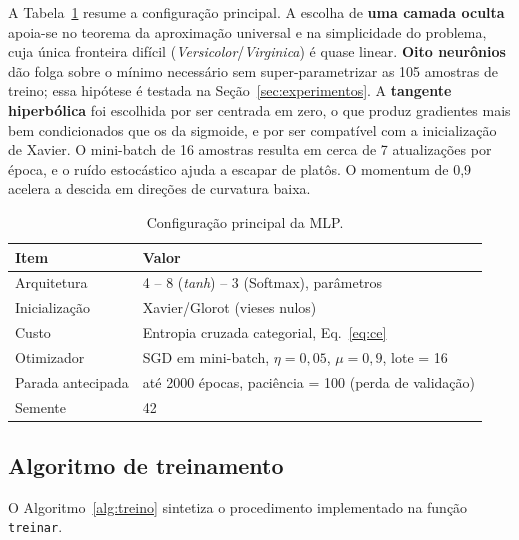 \documentclass[12pt,a4paper]{article}
\begin{document}
A Tabela~\ref{tab:config} resume a configuração principal. A escolha de \textbf{uma camada oculta}
apoia-se no teorema da aproximação universal e na simplicidade do problema, cuja única fronteira
difícil (\textit{Versicolor}/\textit{Virginica}) é quase linear. \textbf{Oito neurônios} dão folga
sobre o mínimo necessário sem super-parametrizar as 105 amostras de treino; essa hipótese é testada
na Seção~\ref{sec:experimentos}. A \textbf{tangente hiperbólica} foi escolhida por ser centrada em
zero, o que produz gradientes mais bem condicionados que os da sigmoide, e por ser compatível com a
inicialização de Xavier. O mini-batch de 16 amostras resulta em cerca de 7 atualizações por época, e
o ruído estocástico ajuda a escapar de platôs. O momentum de 0,9 acelera a descida em direções de
curvatura baixa.

\begin{table}[H]
  \centering
  \caption{Configuração principal da MLP.}
  \label{tab:config}
  \small
  \begin{tabular}{ll}
    \toprule
    Item & Valor \\
    \midrule
    Arquitetura & 4 -- 8 (\textit{tanh}) -- 3 (Softmax), \NParam{} parâmetros \\
    Inicialização & Xavier/Glorot (vieses nulos) \\
    Custo & Entropia cruzada categorial, Eq.~\eqref{eq:ce} \\
    Otimizador & SGD em mini-batch, $\eta=0{,}05$, $\mu=0{,}9$, lote = 16 \\
    Parada antecipada & até 2000 épocas, paciência = 100 (perda de validação) \\
    Semente & 42 \\
    \bottomrule
  \end{tabular}
\end{table}

\subsection{Algoritmo de treinamento}

O Algoritmo~\ref{alg:treino} sintetiza o procedimento implementado na função \texttt{treinar}.
\end{document}
